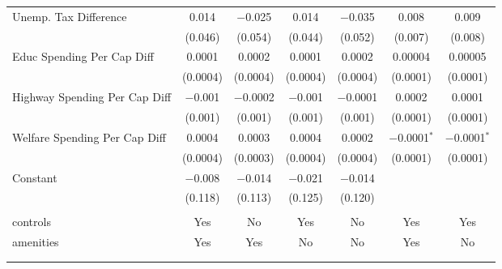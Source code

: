\begin{table}[!htbp]
\begin{tabular}{@{\extracolsep{5pt}}lcccccc}
  Unemp. Tax Difference & 0.014 & $-$0.025 & 0.014 & $-$0.035 & 0.008 & 0.009 \\ 
  & (0.046) & (0.054) & (0.044) & (0.052) & (0.007) & (0.008) \\ 
  Educ Spending Per Cap Diff & 0.0001 & 0.0002 & 0.0001 & 0.0002 & 0.00004 & 0.00005 \\ 
  & (0.0004) & (0.0004) & (0.0004) & (0.0004) & (0.0001) & (0.0001) \\ 
  Highway Spending Per Cap Diff & $-$0.001 & $-$0.0002 & $-$0.001 & $-$0.0001 & 0.0002 & 0.0001 \\ 
  & (0.001) & (0.001) & (0.001) & (0.001) & (0.0001) & (0.0001) \\ 
  Welfare Spending Per Cap Diff & 0.0004 & 0.0003 & 0.0004 & 0.0002 & $-$0.0001$^{*}$ & $-$0.0001$^{*}$ \\ 
  & (0.0004) & (0.0003) & (0.0004) & (0.0004) & (0.0001) & (0.0001) \\ 
  Constant & $-$0.008 & $-$0.014 & $-$0.021 & $-$0.014 &  &  \\ 
  & (0.118) & (0.113) & (0.125) & (0.120) &  &  \\ 
 \hline \\[-1.8ex] 
controls & Yes & No & Yes & No & Yes & Yes \\ 
amenities & Yes & Yes & No & No & Yes & No \\ 
\hline \\[-1.8ex] 
\hline 
\hline \\[-1.8ex] 
\end{tabular} 
\end{table} 

